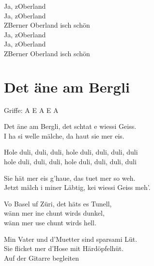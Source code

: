 \documentclass[
  letterpaper,
  twoside=false]{scrbook}
\begin{document}
Ja, z\textquotesingle Oberland\\
Ja, z\textquotesingle Oberland\\
Z\textquotesingle Berner Oberland isch schön\\
Ja, z\textquotesingle Oberland\\
Ja, z\textquotesingle Oberland\\
Z\textquotesingle Berner Oberland isch schön

\hypertarget{det-uxe4ne-am-bergli}{%
\chapter{Det äne am Bergli}\label{det-uxe4ne-am-bergli}}

Griffe: A E A E A

Det äne am Bergli, det schtat e wiessi Geiss.\\
I ha si welle mälche, da haut sie mer eis.

Hole duli, duli, duli, hole duli, duli, duli, duli\\
hole duli, duli, duli, hole duli, duli, duli, duli

Sie hät mer eis g'haue, das tuet mer so weh.\\
Jetzt mälch i miner Läbtig, kei wiessi Geiss meh'.

Vo Basel uf Züri, det häts es Tunell,\\
wänn mer ine chunt wirds dunkel,\\
wänn mer use chunt wirds hell.

Min Vater und d'Muetter sind sparsami Lüt.\\
Sie flicket mer d'Hose mit Härdöpfelhüt.\\
Auf der Gitarre begleiten


\backmatter
\end{document}
